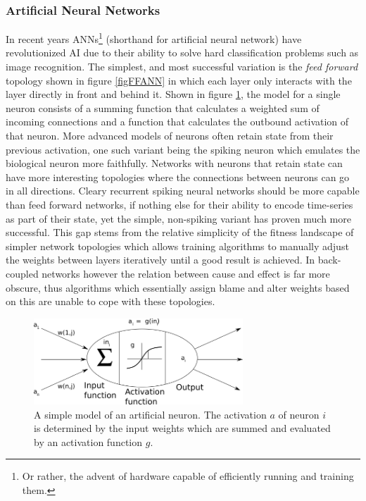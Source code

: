 \subsubsection{Artificial Neural Networks}
In recent years ANNs\footnote{Or rather, the advent of hardware capable of
  efficiently running and training them.} (shorthand for artificial neural
network) have revolutionized AI due to their ability to solve hard
classification problems such as image recognition.
The simplest, and most successful variation is the \emph{feed forward} topology
shown in figure \ref{figFFANN} in which each layer only interacts with the layer
directly in front and behind it.
Shown in figure \ref{figNeuronModel}, the model for a single neuron consists of a
summing function that calculates a weighted sum of incoming connections and a
function that calculates the outbound activation of that neuron.
More advanced models of neurons often retain state from their previous
activation, one such variant being the spiking neuron which emulates the
biological neuron more faithfully.
Networks with neurons that retain state can have more interesting topologies
where the connections between neurons can go in all directions.
Cleary recurrent spiking neural networks should be more capable than feed
forward networks, if nothing else for their ability to encode time-series as
part of their state, yet the simple, non-spiking variant has proven much more
successful.
This gap stems from the relative simplicity of the fitness landscape of simpler
network topologies which allows training algorithms to manually adjust the
weights between layers iteratively until a good result is achieved.
In back-coupled networks however the relation between cause and effect is far
more obscure, thus algorithms which essentially assign blame and alter weights
based on this are unable to cope with these topologies.
\begin{figure}[h!]
  \centering
  \includegraphics[width=0.7\textwidth]{fig/ArtificialNeuron.png}
  \caption{
    A simple model of an artificial neuron.
    The activation $a$ of neuron $i$ is determined by the input weights which
    are summed and evaluated by an activation function $g$.
  }
  \label{figNeuronModel}
\end{figure}
